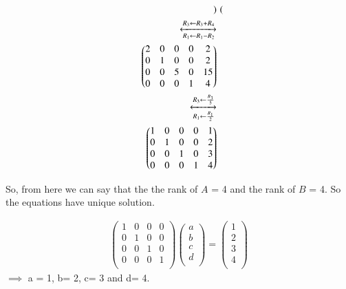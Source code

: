 \begin{equation}
\begin{aligned}
\begin{pmatrix}
    \end{pmatrix}\\
    \xleftrightarrow
    [R_1\leftarrow R_1 -R_2]{R_3\leftarrow R_3 + R_4}\\
    \begin{pmatrix}
      2       & 0    & 0   & 0  & 2\\ 
      0       & 1   & 0   & 0  & 2\\
      0       & 0    & 5   & 0  & 15\\ 
      0       & 0   & 0   & 1   & 4\\
            
    \end{pmatrix}\\
    \xleftrightarrow
    [R_1\leftarrow \frac{R_1}{2}]{R_3\leftarrow \frac{R_3}{5}}\\
    \begin{pmatrix}
      1       & 0    & 0   & 0  & 1\\ 
      0       & 1   & 0   & 0  & 2\\
      0       & 0    & 1   & 0  & 3\\ 
      0       & 0   & 0   & 1   & 4\\
            
    \end{pmatrix}
\end{aligned}
\end{equation}

So, from here we can say that the the rank of $A$ = 4 and the rank of $B$ = 4.
So the equations have unique solution.

\begin{equation}
\begin{aligned}
      \begin{pmatrix}
      1       & 0    & 0   & 0\\ 
      0       & 1   & 0   & 0\\
      0       & 0    & 1   & 0\\ 
      0       & 0   & 0   & 1\\
            
    \end{pmatrix} \begin{pmatrix}
      a\\ 
      b\\
      c\\
      d\\
            
    \end{pmatrix} = \begin{pmatrix}
      1\\ 
      2\\
      3\\
      4\\
            
    \end{pmatrix} 
\end{aligned}
\end{equation}
$\implies $ a = 1, b= 2, c= 3 and d= 4.\\



